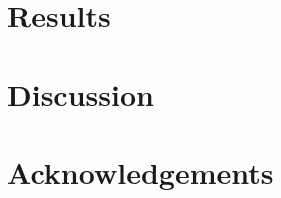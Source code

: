 \documentclass[11pt]{article}
\begin{document}
	
	\section{Results}
	
	
	
	\newpage
	
	\section{Discussion}
	
	
	

	\section{Acknowledgements}

	
	
	
\end{document}
